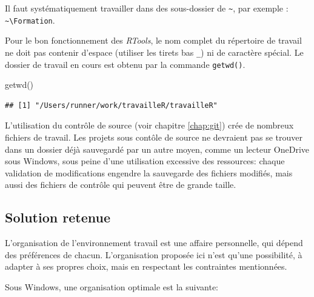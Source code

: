 \documentclass[
  11pt,
  french,
  a4paper,
  extrafontsizes,onecolumn,openright
  ]{memoir}
\newenvironment{Shaded}{\begin{snugshade}}{\end{snugshade}}
\newcommand{\FunctionTok}[1]{\textcolor[rgb]{0.00,0.00,0.00}{#1}}
\newcommand{\NormalTok}[1]{#1}
\begin{document}
Il faut systématiquement travailler dans des sous-dossier de \texttt{\textasciitilde{}}, par exemple : \texttt{\textasciitilde{}\textbackslash{}Formation}.

Pour le bon fonctionnement des \emph{RTools}, le nom complet du répertoire de travail ne doit pas contenir d'espace (utiliser les tirets bas \texttt{\_}) ni de caractère spécial.
Le dossier de travail en cours est obtenu par la commande \texttt{getwd()}.

\scriptsize

\begin{Shaded}
\begin{Highlighting}[]
\FunctionTok{getwd}\NormalTok{()}
\end{Highlighting}
\end{Shaded}

\begin{verbatim}
## [1] "/Users/runner/work/travailleR/travailleR"
\end{verbatim}

\normalsize

L'utilisation du contrôle de source (voir chapitre \ref{chap:git}) crée de nombreux fichiers de travail.
Les projets sous contôle de source ne devraient pas se trouver dans un dossier déjà sauvegardé par un autre moyen, comme un lecteur OneDrive sous Windows, sous peine d'une utilisation excessive des ressources: chaque validation de modifications engendre la sauvegarde des fichiers modifiés, mais aussi des fichiers de contrôle qui peuvent être de grande taille.

\hypertarget{sec:solution-dossiers}{%
\subsection{Solution retenue}\label{sec:solution-dossiers}}

L'organisation de l'environnement travail est une affaire personnelle, qui dépend des préférences de chacun.
L'organisation proposée ici n'est qu'une possibilité, à adapter à ses propres choix, mais en respectant les contraintes mentionnées.

Sous Windows, une organisation optimale est la suivante:
\end{document}
